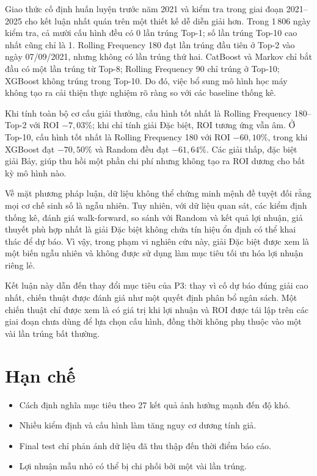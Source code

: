Giao thức cố định huấn luyện trước năm 2021 và kiểm tra trong giai đoạn 2021--2025 cho kết luận nhất quán trên một thiết kế dễ diễn giải hơn. Trong 1\,806 ngày kiểm tra, cả mười cấu hình đều có 0 lần trúng Top-1; số lần trúng Top-10 cao nhất cũng chỉ là 1. Rolling Frequency 180 đạt lần trúng đầu tiên ở Top-2 vào ngày 07/09/2021, nhưng không có lần trúng thứ hai. CatBoost và Markov chỉ bắt đầu có một lần trúng từ Top-8; Rolling Frequency 90 chỉ trúng ở Top-10; XGBoost không trúng trong Top-10. Do đó, việc bổ sung mô hình học máy không tạo ra cải thiện thực nghiệm rõ ràng so với các baseline thống kê.

Khi tính toàn bộ cơ cấu giải thưởng, cấu hình tốt nhất là Rolling Frequency 180--Top-2 với ROI $-7,03\%$; khi chỉ tính giải Đặc biệt, ROI tương ứng vẫn âm. Ở Top-10, cấu hình tốt nhất là Rolling Frequency 180 với ROI $-60,10\%$, trong khi XGBoost đạt $-70,50\%$ và Random đều đạt $-61,64\%$. Các giải thấp, đặc biệt giải Bảy, giúp thu hồi một phần chi phí nhưng không tạo ra ROI dương cho bất kỳ mô hình nào.

Về mặt phương pháp luận, dữ liệu không thể chứng minh mệnh đề tuyệt đối rằng mọi cơ chế sinh số là ngẫu nhiên. Tuy nhiên, với dữ liệu quan sát, các kiểm định thống kê, đánh giá walk-forward, so sánh với Random và kết quả lợi nhuận, giả thuyết phù hợp nhất là giải Đặc biệt không chứa tín hiệu ổn định có thể khai thác để dự báo. Vì vậy, trong phạm vi nghiên cứu này, giải Đặc biệt được xem là một biến ngẫu nhiên và không được sử dụng làm mục tiêu tối ưu hóa lợi nhuận riêng lẻ.

Kết luận này dẫn đến thay đổi mục tiêu của P3: thay vì cố dự báo đúng giải cao nhất, chiến thuật được đánh giá như một quyết định phân bổ ngân sách. Một chiến thuật chỉ được xem là có giá trị khi lợi nhuận và ROI được tái lập trên các giai đoạn chưa dùng để lựa chọn cấu hình, đồng thời không phụ thuộc vào một vài lần trúng bất thường.

\section{Hạn chế}
\begin{itemize}
	\item Cách định nghĩa mục tiêu theo 27 kết quả ảnh hưởng mạnh đến độ khó.
	\item Nhiều kiểm định và cấu hình làm tăng nguy cơ dương tính giả.
	\item Final test chỉ phản ánh dữ liệu đã thu thập đến thời điểm báo cáo.
	\item Lợi nhuận mẫu nhỏ có thể bị chi phối bởi một vài lần trúng.
\end{itemize}
